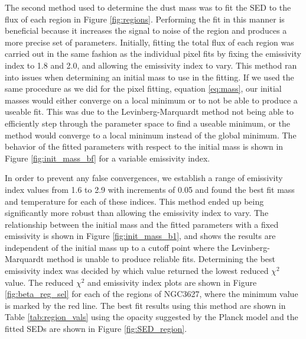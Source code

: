 The second method used to determine the dust mass was to fit the SED to the flux of each region in Figure \ref{fig:regions}.  Performing the fit in this manner is beneficial because it increases the signal to noise of the region and produces a more precise set of parameters.  Initially, fitting the total flux of each region was carried out in the same fashion as the individual pixel fits by fixing the emissivity index to 1.8 and 2.0, and allowing the emissivity index to vary.  This method ran into issues when determining an initial mass to use in the fitting.  If we used the same procedure as we did for the pixel fitting, equation \ref{eq:mass}, our initial masses would either converge on a local minimum or to not be able to produce a useable fit.  This was due to the Levinberg-Marquardt method not being able to efficiently step through the parameter space to find a useable minimum, or the method would converge to a local minimum instead of the global minimum.  The behavior of the fitted parameters with respect to the initial mass is shown in Figure \ref{fig:init_mass_bf} for a variable emissivity index.  

In order to prevent any false convergences, we establish a range of emissivity index values from 1.6 to 2.9 with increments of 0.05 and found the best fit mass and temperature for each of these indices.  This method ended up being significantly more robust than allowing the emissivity index to vary.  The relationship between the initial mass and the fitted parameters with a fixed emissivity is shown in Figure \ref{fig:init_mass_b1}, and shows the results are independent of the initial mass up to a cutoff point where the Levinberg-Marquardt method is unable to produce reliable fits.  Determining the best emissivity index was decided by which value returned the lowest reduced $\chi^2$ value.  The reduced $\chi^2$ and emissivity index plots are shown in Figure \ref{fig:beta_reg_sel} for each of the regions of NGC3627, where the minimum value is marked by the red line.  The best fit results using this method are shown in Table \ref{tab:region_vals} using the opacity suggested by the Planck model and the fitted SEDs are shown in Figure \ref{fig:SED_region}.

